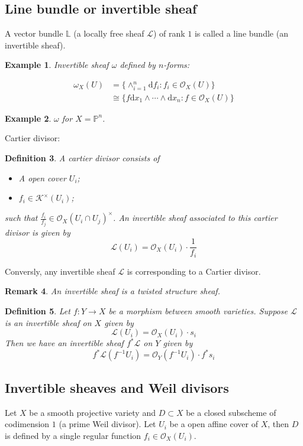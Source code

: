 \documentclass{article}
\newtheorem{defn}{Definition}[section]
\newtheorem{rmk}[defn]{Remark}
\newtheorem{exa}[defn]{Example}
\begin{document}
\subsection{Line bundle or invertible sheaf}
A vector bundle $\mathbb{L}$ (a locally free sheaf $\mathcal{L}$) of rank $1$ is called a line bundle (an invertible sheaf).
\begin{exa}
	Invertible sheaf $\omega$ defined by $n$-forms:

	\begin{align*}
		\omega_{X}(U) & = \{\wedge_{i=1}^{n}\mathrm{d}f_{i}: f_{i} \in \mathcal{O}_{X}(U)\}                     \\
		              & \cong \{f\mathrm{d}x_{1}\wedge\cdots \wedge \mathrm{d}x_{n}: f \in \mathcal{O}_{X}(U)\}
	\end{align*}
\end{exa}

\begin{exa}
	$\omega$ for $X=\mathbb{P}^{n}$.
\end{exa}

Cartier divisor:
\begin{defn}
	A cartier divisor consists of
	\begin{itemize}
		\item A open cover $U_{i}$;
		\item $f_{i}\in \mathcal{K}^{\times}(U_{i})$;
	\end{itemize}
	such that $ \frac{f_{i}}{f_{j}}\in \mathcal{O}_{X}(U_{i} \cap  U_{j})^{\times}$. An invertible sheaf associated to this cartier divisor is given by
	\[
		\mathcal{L}(U_{i})=\mathcal{O}_{X}(U_{i})\cdot \frac{1}{f_{i}}
	\]
\end{defn}
Conversly, any invertible sheaf $\mathcal{L}$ is corresponding to a Cartier divisor.

\begin{rmk}
	An invertible sheaf is a \emph{twisted structure sheaf}.
\end{rmk}
\begin{defn}
	Let $f:Y\to X$ be a morphism between smooth varieties. Suppose $\mathcal{L}$ is an invertible sheaf on $X$ given by
	\[
		\mathcal{L}(U_{i})=\mathcal{O}_{X}(U_{i})\cdot s_{i}
	\]
	Then we have an invertible sheaf $f^*\mathcal{L}$ on $Y$ given by
	\[
		f^{*}\mathcal{L}(f^{-1}U_{i})=\mathcal{O}_{Y}(f^{-1}U_{i})\cdot f^*s_{i}
	\]
\end{defn}

\subsection{Invertible sheaves and Weil divisors}
Let  $X$ be a smooth projective variety and $D \subset X$ be a closed subscheme of codimension $1$ (a prime Weil divisor). Let $U_{i}$ be a open affine cover of $X$, then $D$ is defined by a single regular function $f_{i}\in \mathcal{O}_{X}(U_{i})$.
\end{document}
